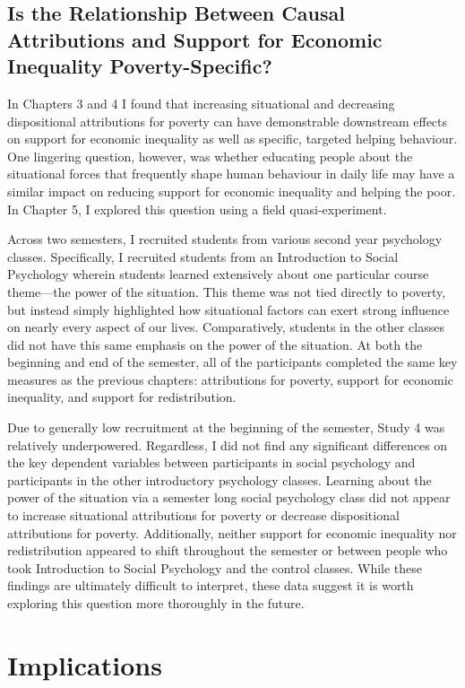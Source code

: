 \documentclass{sfuthesis}
\begin{document}
\subsection{Is the Relationship Between Causal Attributions and Support for Economic Inequality Poverty-Specific?}

In Chapters 3 and 4 I found that increasing situational and decreasing dispositional attributions for poverty can have demonstrable downstream effects on support for economic inequality as well as specific, targeted helping behaviour. One lingering question, however, was whether educating people about the situational forces that frequently shape human behaviour in daily life may have a similar impact on reducing support for economic inequality and helping the poor. In Chapter 5, I explored this question using a field quasi-experiment.

Across two semesters, I recruited students from various second year psychology classes. Specifically, I recruited students from an Introduction to Social Psychology wherein students learned extensively about one particular course theme—the power of the situation. This theme was not tied directly to poverty, but instead simply highlighted how situational factors can exert strong influence on nearly every aspect of our lives. Comparatively, students in the other classes did not have this same emphasis on the power of the situation. At both the beginning and end of the semester, all of the participants completed the same key measures as the previous chapters: attributions for poverty, support for economic inequality, and support for redistribution.

Due to generally low recruitment at the beginning of the semester, Study 4 was relatively underpowered. Regardless, I did not find any significant differences on the key dependent variables between participants in social psychology and participants in the other introductory psychology classes. Learning about the power of the situation via a semester long social psychology class did not appear to increase situational attributions for poverty or decrease dispositional attributions for poverty. Additionally, neither support for economic inequality nor redistribution appeared to shift throughout the semester or between people who took Introduction to Social Psychology and the control classes. While these findings are ultimately difficult to interpret, these data suggest it is worth exploring this question more thoroughly in the future.

\section{Implications}
\end{document}
